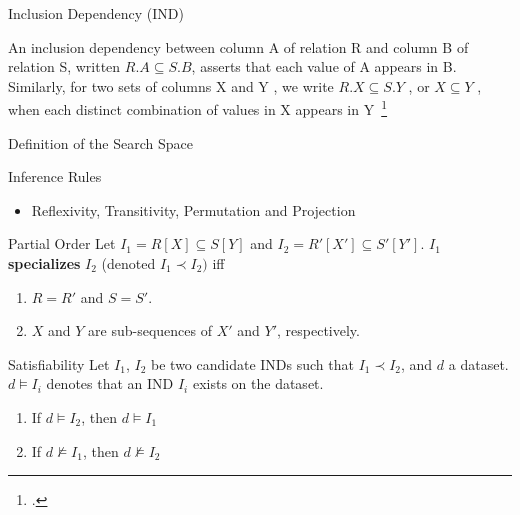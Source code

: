 \documentclass[10pt]{beamer}
\begin{document}
\begin{frame}{Inclusion Dependency (IND)}
    \begin{block}{}
        \smallskip
        An inclusion dependency between column A of relation
        R and column B of relation S, written $R.A \subseteq S.B$, asserts that each
        value of A appears in B. Similarly, for two sets of columns X
        and Y , we write $R.X \subseteq S.Y$ , or $X \subseteq Y$ , when each distinct
        combination of values in X appears in Y~\footcite{Casanova1984,DeMarchi2002,abedjan2015}
    \end{block}
\end{frame}

\begin{frame}{Definition of the Search Space}
        \begin{block}{Inference Rules}
        \begin{itemize}
            \item Reflexivity, Transitivity, Permutation and Projection
        \end{itemize}
    \end{block}
    \begin{block}{Partial Order}
        Let $I_1 = R[X] \subseteq S[Y]$ and $I_2 = R'[X'] \subseteq S'[Y']$.       
        $I_1$ \textbf{specializes} $I_2$ (denoted $I_1 \prec I_2)$ iff
        \begin{enumerate}
            \item $R = R'$ and $S = S'$.
            \item $X$ and $Y$ are sub-sequences of $X'$ and $Y'$, respectively.
        \end{enumerate}
    \end{block}
    \begin{block}{Satisfiability}
         Let $I_1$, $I_2$ be two candidate INDs such that $I_1 \prec I_2$, and $d$ a dataset.
         $d \models I_i$ denotes that an IND $I_i$ exists on the dataset.
         \begin{enumerate}
             \item If $d \models I_2$, then $d \models I_1$
             \item If $d \not\models I_1$, then $d \not\models I_2$
         \end{enumerate}
    \end{block}
\end{frame}
\end{document}

